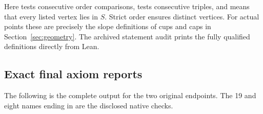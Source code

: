 Here  tests consecutive order comparisons,
 tests consecutive triples, and  means
that every listed vertex lies in $S$. Strict order ensures distinct
vertices. For actual points these are precisely the slope definitions
of cups and caps in Section~\ref{sec:geometry}. The archived statement
audit prints the fully qualified definitions directly from Lean.
\endgroup

\clearpage
\subsection{Exact final axiom reports}
The following is the complete  output for the
two original endpoints. The 19 and eight names ending in
 are the disclosed native checks.

